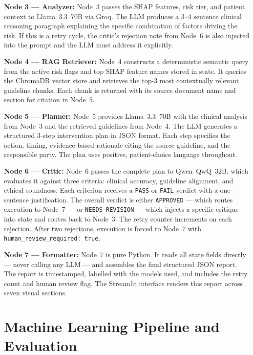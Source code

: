 \documentclass[12pt, a4paper]{report}
\begin{document}
\textbf{Node 3 --- Analyzer:}
Node~3 passes the SHAP features, risk tier, and patient context to Llama~3.3~70B via Groq. The LLM produces a 3--4 sentence clinical reasoning paragraph explaining the specific combination of factors driving the risk. If this is a retry cycle, the critic's rejection note from Node~6 is also injected into the prompt and the LLM must address it explicitly.

\textbf{Node 4 --- RAG Retriever:}
Node~4 constructs a deterministic semantic query from the active risk flags and top SHAP feature names stored in state. It queries the ChromaDB vector store and retrieves the top-3 most contextually relevant guideline chunks. Each chunk is returned with its source document name and section for citation in Node~5.

\textbf{Node 5 --- Planner:}
Node~5 provides Llama~3.3~70B with the clinical analysis from Node~3 and the retrieved guidelines from Node~4. The LLM generates a structured 3-step intervention plan in JSON format. Each step specifies the action, timing, evidence-based rationale citing the source guideline, and the responsible party. The plan uses positive, patient-choice language throughout.

\textbf{Node 6 --- Critic:}
Node~6 passes the complete plan to Qwen~QwQ~32B, which evaluates it against three criteria: clinical accuracy, guideline alignment, and ethical soundness. Each criterion receives a \texttt{PASS} or \texttt{FAIL} verdict with a one-sentence justification. The overall verdict is either \texttt{APPROVED} --- which routes execution to Node~7 --- or \texttt{NEEDS\_REVISION} --- which injects a specific critique into state and routes back to Node~3. The retry counter increments on each rejection. After two rejections, execution is forced to Node~7 with \texttt{human\_review\_required: true}.

\textbf{Node 7 --- Formatter:}
Node~7 is pure Python. It reads all state fields directly --- never calling any LLM --- and assembles the final structured JSON report. The report is timestamped, labelled with the models used, and includes the retry count and human review flag. The Streamlit interface renders this report across seven visual sections.


\chapter{Machine Learning Pipeline and Evaluation}
\end{document}
